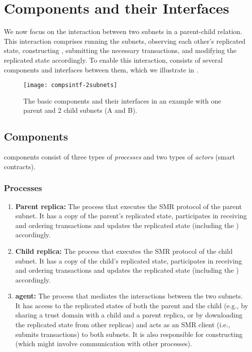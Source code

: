  \section{Components and their Interfaces}
 \label{sec:components}

We now focus on the interaction between two subnets in a parent-child relation.
This interaction comprises running the subnets, observing each other's replicated state,
constructing \pofsFull, submitting the necessary transactions, and modifying the replicated state accordingly. To enable this interaction, \ipc consists of 
several components and interfaces between them, which we  
illustrate in .\\

\begin{figure}[ht]
     \centering
     \texttt{[image: compsintf-2subnets]}
     \caption{The basic \ipc components and their interfaces in an example with one parent and 2 child subnets (A and B).}
     \label{fig:interfaces}
 \end{figure}

\subsection{Components}

\ipc components consist of three types  of \emph{processes} and two types of \emph{actors} (smart contracts).

\subsubsection{Processes}

\begin{enumerate}
    
    \item \textbf{Parent replica:} The process that executes the SMR protocol of the parent subnet. It has a copy of the parent's replicated state, participates in receiving and ordering transactions and updates the replicated state (including the \sa \dapp) accordingly.
    
    \item \textbf{Child replica:} The process that executes the SMR protocol of the child subnet. It has a copy of the child's replicated state, participates in receiving and ordering transactions and updates the replicated state (including the \gw \dapp) accordingly.

    \item \textbf{\ipc agent:} The process that mediates the interactions between the two subnets.
    It has access to the replicated states of both the parent and the child
    (e.g., by sharing a trust domain with a child and a parent replica, or by downloading the replicated state from other replicas)
    and acts as an SMR client (i.e., submits transactions) to both subnets.
    It is also responsible for constructing \pofsFull (which might involve communication with other processes).

\end{enumerate}
 
